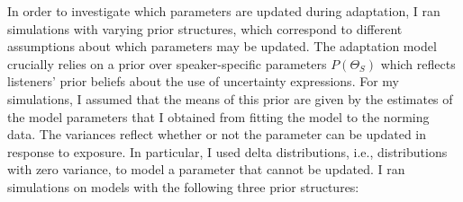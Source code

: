 In order to investigate which parameters are updated during adaptation, I ran simulations
with varying prior structures, which correspond to different assumptions about which parameters may be updated.
The adaptation model crucially relies on a prior over speaker-specific parameters $P(\Theta_S)$
which reflects listeners' prior beliefs about the use of uncertainty expressions. For my simulations,
I assumed that the means of this prior are given by the estimates of the model parameters that 
I obtained from fitting the model to the norming data. The variances reflect whether or not the parameter can be updated in response to exposure. In particular, I used delta distributions, i.e., distributions with zero variance, to model a parameter that cannot be updated. I ran simulations on models with the following three prior structures:


